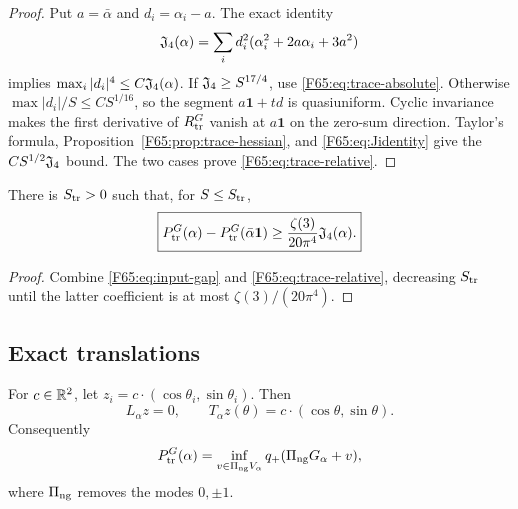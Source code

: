 \begin{proof}
Put $a=\bar\alpha$ and $d_i=\alpha_i-a$.  The exact identity
\begin{equation}\label{F65:eq:Jidentity}
 \mathfrak J_4(\alpha)
 =\sum_i d_i^2(\alpha_i^2+2a\alpha_i+3a^2)
\end{equation}
implies $\max_i|d_i|^4\le C\mathfrak J_4(\alpha)$.
If $\mathfrak J_4\ge S^{17/4}$, use \eqref{F65:eq:trace-absolute}.  Otherwise
$\max|d_i|/S\le CS^{1/16}$, so the segment
$a\mathbf1+td$ is quasiuniform.  Cyclic invariance makes the first
derivative of $R_{\rm tr}^G$ vanish at $a\mathbf1$ on the zero-sum
direction.  Taylor's formula, Proposition~\ref{F65:prop:trace-hessian}, and
\eqref{F65:eq:Jidentity} give the $CS^{1/2}\mathfrak J_4$ bound.  The two cases prove
\eqref{F65:eq:trace-relative}.
\end{proof}

\begin{theorem}\label{F65:thm:trace-gap}
There is $S_{\rm tr}>0$ such that, for $S\le S_{\rm tr}$,
\begin{equation}\label{F65:eq:trace-gap}
 \boxed{
 P_{\rm tr}^G(\alpha)-P_{\rm tr}^G(\bar\alpha\mathbf1)
 \ge\frac{\zeta(3)}{20\pi^4}\mathfrak J_4(\alpha).}
\end{equation}
\end{theorem}

\begin{proof}
Combine \eqref{F65:eq:input-gap} and \eqref{F65:eq:trace-relative}, decreasing
$S_{\rm tr}$ until the latter coefficient is at most
$\zeta(3)/(20\pi^4)$.
\end{proof}

\subsection{Exact translations}\label{F65:sec:translations}

\begin{lemma}\label{F65:lem:translations}
For $c\in\mathbb R^2$, let $z_i=c\cdot(\cos\theta_i,\sin\theta_i)$.  Then
\begin{equation}\label{F65:eq:translation}
 L_\alpha z=0,
 \qquad T_\alpha z(\theta)=c\cdot(\cos\theta,\sin\theta).
\end{equation}
Consequently
\begin{equation}\label{F65:eq:translation-quotient}
 P_{\rm tr}^G(\alpha)
 =\inf_{v\in\Pi_{\rm ng} V_\alpha}
 q_+(\Pi_{\rm ng} G_\alpha+v),
\end{equation}
where $\Pi_{\rm ng}$ removes the modes $0,\pm1$.
\end{lemma}

